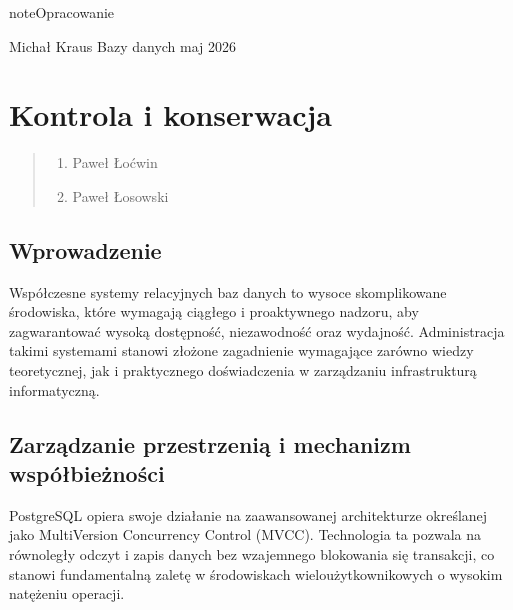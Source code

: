 \documentclass[letterpaper,10pt,english]{sphinxmanual}
\begin{document}
\begin{sphinxadmonition}{note}{Opracowanie}

\sphinxAtStartPar
{} Michał Kraus
 Bazy danych
 maj 2026
\end{sphinxadmonition}

\sphinxstepscope


\section{Kontrola i konserwacja}
\label{\detokenize{rozdzial_2/rozdzial_23/index:kontrola-i-konserwacja}}\label{\detokenize{rozdzial_2/rozdzial_23/index::doc}}\begin{quote}\begin{description}
\begin{enumerate}
%
\item {} 
\sphinxAtStartPar
Paweł Łoćwin

\item {} 
\sphinxAtStartPar
Paweł Łosowski

\end{enumerate}

\end{description}\end{quote}


\subsection{Wprowadzenie}
\label{\detokenize{rozdzial_2/rozdzial_23/index:wprowadzenie}}
\sphinxAtStartPar
Współczesne systemy relacyjnych baz danych to wysoce skomplikowane środowiska, które wymagają ciągłego i proaktywnego nadzoru, aby zagwarantować wysoką dostępność, niezawodność oraz wydajność. Administracja takimi systemami stanowi złożone zagadnienie wymagające zarówno wiedzy teoretycznej, jak i praktycznego doświadczenia w zarządzaniu infrastrukturą informatyczną.


\subsection{Zarządzanie przestrzenią i mechanizm współbieżności}
\label{\detokenize{rozdzial_2/rozdzial_23/index:zarzadzanie-przestrzenia-i-mechanizm-wspolbieznosci}}
\sphinxAtStartPar
PostgreSQL opiera swoje działanie na zaawansowanej architekturze określanej jako Multi\sphinxhyphen{}Version Concurrency Control (MVCC). Technologia ta pozwala na równoległy odczyt i zapis danych bez wzajemnego blokowania się transakcji, co stanowi fundamentalną zaletę w środowiskach wieloużytkownikowych o wysokim natężeniu operacji.
\end{document}
